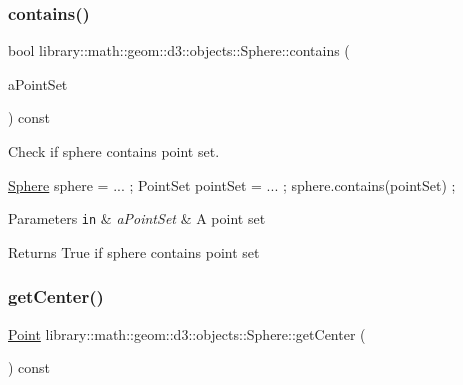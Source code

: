 \subsubsection{\texorpdfstring{contains()}{contains()}\hspace{0.1cm}{\footnotesize\ttfamily [2/2]}}
{\footnotesize\ttfamily bool library\+::math\+::geom\+::d3\+::objects\+::\+Sphere\+::contains (\begin{DoxyParamCaption}\item[{const \hyperlink{classlibrary_1_1math_1_1geom_1_1d3_1_1objects_1_1_point_set}{Point\+Set} \&}]{a\+Point\+Set }\end{DoxyParamCaption}) const}



Check if sphere contains point set. 


\begin{DoxyCode}
\hyperlink{classlibrary_1_1math_1_1geom_1_1d3_1_1objects_1_1_sphere_a55dccc8ea16ee55cd7694c26afa8ea39}{Sphere} sphere = ... ;
PointSet pointSet = ... ;
sphere.contains(pointSet) ;
\end{DoxyCode}



\begin{DoxyParams}[1]{Parameters}
\mbox{\tt in}  & {\em a\+Point\+Set} & A point set \\
\hline
\end{DoxyParams}
\begin{DoxyReturn}{Returns}
True if sphere contains point set 
\end{DoxyReturn}
\mbox{\label{classlibrary_1_1math_1_1geom_1_1d3_1_1objects_1_1_sphere_a871367ab75aa46194a6b8ddc8a45967f}} 
\subsubsection{\texorpdfstring{get\+Center()}{getCenter()}}
{\footnotesize\ttfamily \hyperlink{classlibrary_1_1math_1_1geom_1_1d3_1_1objects_1_1_point}{Point} library\+::math\+::geom\+::d3\+::objects\+::\+Sphere\+::get\+Center (\begin{DoxyParamCaption}{ }\end{DoxyParamCaption}) const}



